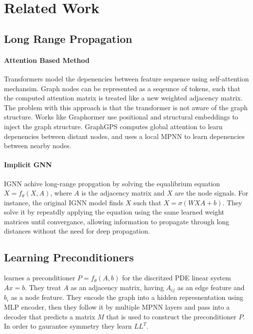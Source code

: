 \section{Related Work}
\subsection{Long Range Propagation}

\paragraph{Attention Based Method}
Transformers \cite{vaswaniAttentionAllYou2023} model the depenencies between
feature sequence using self-attention mechansim. Graph nodes can be represented
as a seqeunce of tokens, such that the computed attention matrix is treated
like a new weighted adjacency matrix. The problem with this approach is that
the transformer is not aware of the graph structure. Works like Graphormer
\cite{yingTransformersReallyPerform2021a} use positional and structural
embeddings to inject the graph structure. GraphGPS
\cite{rampasekRecipeGeneralPowerful2023} computes global attention to learn
depenencies between distant nodes, and uses a local MPNN to learn depenencies
between nearby nodes.

\paragraph{Implicit GNN}
\cite{bakerImplicitGraphNeural,bakerMonotoneOperatorTheoryInspired2024}
IGNN achive long-range propgation by solving the equalibrium equation $X =
    f_\theta(X,A)$, where $A$ is the   adjacency matrix and $X$ are the node
signals. For instance, the original IGNN model \cite{guImplicitGraphNeural2021}
finds $X$ such that $X = \sigma(WXA + b)$. They solve it by repeatdly applying
the equation using the same learned weight matrices until convergance, allowing
information to propagate through long distances without the need for deep
propagation.

\subsection{Learning Preconditioners}
\cite{liLearningPreconditionerConjugate2023} learnes a preconditioner $P =
f_\theta(A,b)$ for the discritzed PDE linear system $Ax = b$. They treat $A$ as
an adjacency matrix, having $A_{ij}$ as an edge feature and $b_{i}$ as a node
feature. They encode the graph into a hidden represnentation using MLP encoder,
then they follow it by multiple MPNN layers and pass into a decoder that
predicts a matrix $M$ that is used to construct the preconditioner $P$. In
order to gaurantee symmetry they learn $LL^T$.

